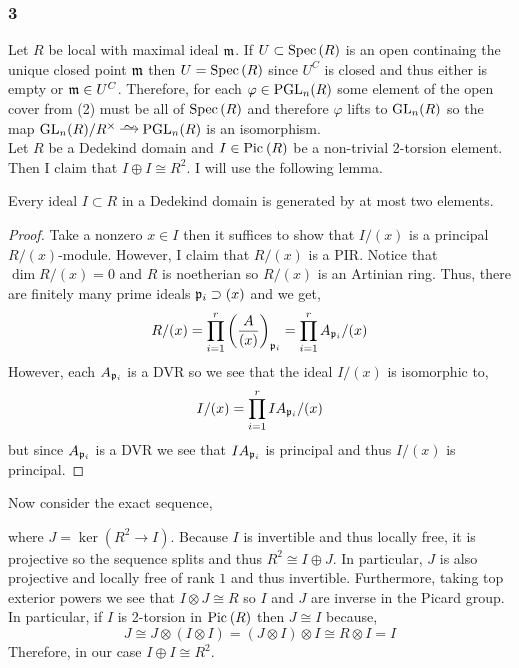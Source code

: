 \documentclass[12pt]{article}
\begin{document}
\subsubsection{3}

Let $R$ be local with maximal ideal $\mathfrak{m}$. If $U \subset \mathrm{Spec}\left( R \right)$ is an open continaing the unique closed point $\mathfrak{m}$ then $U = \mathrm{Spec}\left( R \right)$ since $U^C$ is closed and thus either is empty or $\mathfrak{m} \in U^C$. Therefore, for each $\varphi \in \mathrm{PGL}_n(R)$ some element of the open cover from (2) must be all of $\mathrm{Spec}\left( R \right)$ and therefore $\varphi$ lifts to $\mathrm{GL}_n(R)$ so the map $\GL_n(R) / R^\times \iso \PGL_n(R)$ is an isomorphism.
\bigskip\\
Let $R$ be a Dedekind domain and $I \in \mathrm{Pic}^{} \left( R \right)$ be a non-trivial 2-torsion element. Then I claim that $I \oplus I \cong R^2$. I will use the following lemma.

\begin{lemma}
Every ideal $I \subset R$ in a Dedekind domain is generated by at most two elements. 
\end{lemma}

\begin{proof}
Take a nonzero $x \in I$ then it suffices to show that $I/(x)$ is a principal $R/(x)$-module. However, I claim that $R/(x)$ is a PIR. Notice that $\dim{R/(x)} = 0$ and $R$ is noetherian so $R/(x)$ is an Artinian ring. Thus, there are finitely many prime ideals $\mathfrak{p}_i \supset (x)$ and we get,
\[ R / (x) = \prod_{i = 1}^r \left( \frac{A}{(x)} \right)_{\mathfrak{p}_i} = \prod_{i = 1}^r A_{\mathfrak{p}_i}/(x) \]
However, each $A_{\mathfrak{p}_i}$ is a DVR so we see that the ideal $I/(x)$ is isomorphic to,
\[ I/(x) = \prod_{i = 1}^r I A_{\mathfrak{p}_i} / (x) \]
but since $A_{\mathfrak{p}_i}$ is a DVR we see that $I A_{\mathfrak{p}_i}$ is principal and thus $I/(x)$ is principal.
\end{proof}
\noindent
Now consider the exact sequence,
\begin{center}
\end{center}
where $J = \ker{(R^2 \to I)}$. Because $I$ is invertible and thus locally free, it is projective so the sequence splits and thus $R^2 \cong I \oplus J$. In particular, $J$ is also projective and locally free of rank $1$ and thus invertible. Furthermore, taking top exterior powers we see that $I \otimes J \cong R$ so $I$ and $J$ are inverse in the Picard group. In particular, if $I$ is 2-torsion in $\mathrm{Pic}^{} \left( R \right)$ then $J \cong I$ because,
\[ J \cong J \otimes (I \otimes I) = (J \otimes I) \otimes I \cong R \otimes I = I \]
Therefore, in our case $I \oplus I \cong R^2$. 
\end{document}
